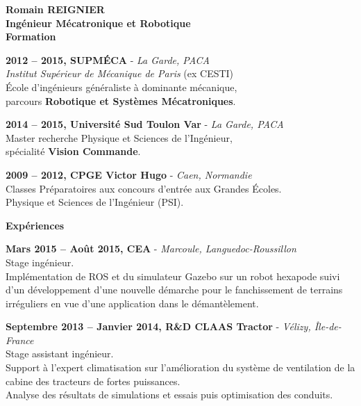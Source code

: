 \documentclass[a4paper,11pt,final]{memoir}
\newcommand{\Sep}{\vspace{1.5em}}
\newcommand{\SmallSep}{\vspace{0.5em}}
\newenvironment{AboutMe}
	{\ignorespaces}%
	{\SmallSep\ignorespacesafterend}
\newcommand{\CVSection}[1]
	{\Large\textbf{#1}\par
	\SmallSep\normalsize\normalfont}
\newcommand{\CVItem}[2]
	{\textbf{\color{RoyalBlue} #1 \color{dark_gray} #2}\normalsize\normalfont}
\newcommand{\city}[1]
	{{\small\color{dark_gray}\emph{#1}}\normalsize\normalfont}
\begin{document}
\Huge\bfseries {\color{RoyalBlue} Romain REIGNIER} \\
\Large\bfseries  Ingénieur Mécatronique et Robotique\\

\CVSection{Formation}

\CVItem{2012 -- 2015,}{SUPMÉCA} - \city{La Garde, PACA}\\
\emph{Institut Supérieur de Mécanique de Paris} (ex CESTI)\\
École d'ingénieurs généraliste à dominante mécanique, \\parcours \textbf{Robotique et Systèmes Mécatroniques}.
\SmallSep

\CVItem{2014 -- 2015,}{Université Sud Toulon Var} - \city{La Garde, PACA}\\
Master recherche Physique et Sciences de l'Ingénieur,\\ spécialité \textbf{Vision Commande}.
\SmallSep

\CVItem{2009 -- 2012,}{CPGE Victor Hugo} - \city{Caen, Normandie}\\
Classes Préparatoires aux concours d'entrée aux Grandes Écoles.\\
Physique et Sciences de l'Ingénieur (PSI).

\Sep
\CVSection{Expériences}

\CVItem{Mars 2015 -- Août 2015,}{CEA} - \city{Marcoule, Languedoc-Roussillon}\\
Stage ingénieur.\\
Implémentation de ROS et du simulateur Gazebo sur un robot hexapode suivi d'un développement d'une nouvelle démarche pour le fanchissement de terrains irréguliers en vue d'une application dans le démantèlement.
\SmallSep

\CVItem{Septembre 2013 -- Janvier 2014,}{R\&D CLAAS Tractor} - \city{Vélizy, Île-de-France}\\
Stage assistant ingénieur.\\
Support à l'expert climatisation sur l'amélioration du système de ventilation de la cabine des tracteurs de fortes puissances.\\
Analyse des résultats de simulations et essais puis optimisation des conduits.
\SmallSep
\end{document}
